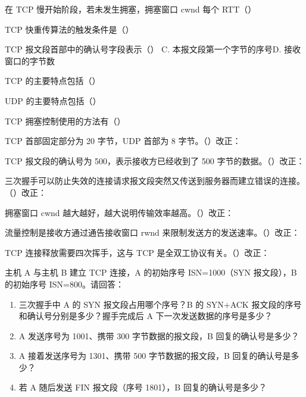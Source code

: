 \documentclass[a4paper,11pt]{article}
\begin{document}
\q 在 TCP 慢开始阶段，若未发生拥塞，拥塞窗口 cwnd 每个 RTT（\quad）

\q TCP 快重传算法的触发条件是（\quad）

\q TCP 报文段首部中的确认号字段表示（\quad）
{C. 本报文段第一个字节的序号}{D. 接收窗口的字节数}

\q TCP 的主要特点包括（\quad）

\q UDP 的主要特点包括（\quad）

\q TCP 拥塞控制使用的方法有（\quad）

\q TCP 首部固定部分为 20 字节，UDP 首部为 8 字节。\quad（\quad）\quad 改正：\fixblank

\q TCP 报文段的确认号为 500，表示接收方已经收到了 500 字节的数据。\quad（\quad）\quad 改正：\fixblank

\q 三次握手可以防止失效的连接请求报文段突然又传送到服务器而建立错误的连接。\quad（\quad）\quad 改正：\fixblank

\q 拥塞窗口 cwnd 越大越好，越大说明传输效率越高。\quad（\quad）\quad 改正：\fixblank

\q 流量控制是接收方通过通告接收窗口 rwnd 来限制发送方的发送速率。\quad（\quad）\quad 改正：\fixblank

\q TCP 连接释放需要四次挥手，这与 TCP 是全双工协议有关。\quad（\quad）\quad 改正：\fixblank

\q 主机 A 与主机 B 建立 TCP 连接，A 的初始序号 ISN=1000（SYN 报文段），B 的初始序号 ISN=800。请回答：
\begin{enumerate}[leftmargin=2em, itemsep=1pt, topsep=2pt]
  \item 三次握手中 A 的 SYN 报文段占用哪个序号？B 的 SYN+ACK 报文段的序号和确认号分别是多少？握手完成后 A 下一次发送数据的序号是多少？
  \item A 发送序号为 1001、携带 300 字节数据的报文段，B 回复的确认号是多少？
  \item A 接着发送序号为 1301、携带 500 字节数据的报文段，B 回复的确认号是多少？
  \item 若 A 随后发送 FIN 报文段（序号 1801），B 回复的确认号是多少？
\end{enumerate}
\anslines{5cm}
\end{document}
